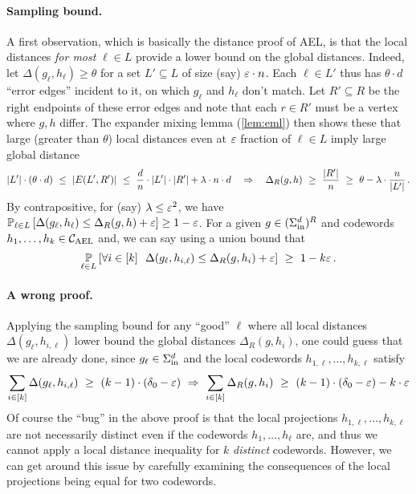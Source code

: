 \paragraph{Sampling bound.}
A first observation, which is basically the distance proof of AEL,  is that the local distances
\emph{for most} $\ell \in L$ provide a lower bound on the global distances. 
%
Indeed, let $\Delta(g_{\ell}, h_{\ell}) \geq \theta$ for a set $L' \subseteq L$ of size (say) $\varepsilon
\cdot n$.
%
Each $\ell \in L'$ thus has $\theta \cdot d$ ``error edges'' incident to it, on which $g_{\ell}$ and
$h_{\ell}$ don't match.
%
Let $R' \subseteq R$ be the right endpoints of these error edges and note that each $r \in R'$ must be a vertex
where $g, h$ differ.
%
The expander mixing lemma (\cref{lem:eml}) then shows these that large (greater than $\theta$)
local distances even at $\varepsilon$ fraction of $\ell \in L$ imply large global distance
\[
\lvert L'\rvert \cdot (\theta \cdot d) ~\leq~ \lvert E(L',R')\rvert ~\leq~ \frac{d}{n} \cdot \lvert L'\rvert \cdot
\lvert R'\rvert + \lambda \cdot n \cdot d
\quad \Rightarrow \quad
\Delta_R(g,h) ~\geq~ \frac{\lvert R'\rvert}{n} ~\geq~ \theta - \lambda \cdot \frac{n}{\lvert L'\rvert} \,.
\]
By contrapositive, for (say) $\lambda \leq \varepsilon^2$, we have $\Pr{\ell \in L}{\Delta(g_{\ell}, h_{\ell}) \leq
  \Delta_R(g,h) + \eps} \geq 1 - \eps$.
%
For a given $g \in (\Sigma_{\mathrm{in}}^d)^R$ and codewords $h_1, \ldots, h_k \in { {\mathcal C}_{\mathrm{AEL}} }$ and, we can say
using a union bound that
\[
\Pr{\ell \in L}{\forall i \in [k]~~ \Delta(g_{\ell}, h_{i,\ell}) \leq \Delta_R(g,h_i) + \eps} ~\geq~ 1 -
k\eps \mper
\]
%
\vspace{-20 pt}
\paragraph{A wrong proof.}
%
Applying the sampling bound for any ``good'' $\ell$ where all local distances $\Delta(g_{\ell},h_{i,\ell})$
lower bound the global distances $\Delta_R(g,h_i)$, one could guess that we are
already done, since $g_{\ell} \in \Sigma_{\mathrm{in}}^d$ and the local codewords $h_{1,\ell}, \ldots,
h_{k,\ell}$ satisfy
%
\[
\sum_{i \in [k]} \Delta(g_{\ell}, h_{i,\ell}) ~\geq~ (k - 1) \cdot (\delta_0 - \varepsilon) 
~\Rightarrow~
\sum_{i \in [k]} \Delta_R(g,h_i) ~\geq~ (k-1) \cdot (\delta_0 - \varepsilon) - k \cdot \varepsilon
\]
%
Of course the ``bug'' in the above proof is that the local projections $h_{1, \ell}, \ldots,
h_{k,\ell}$ are not necessarily distinct even if the codewords $h_1, \ldots, h_{\ell}$ are, and thus we
cannot apply a local distance inequality for $k$ \emph{distinct} codewords.
%
However, we can get around this issue by carefully examining the consequences of the local
projections being equal for two codewords.
%

